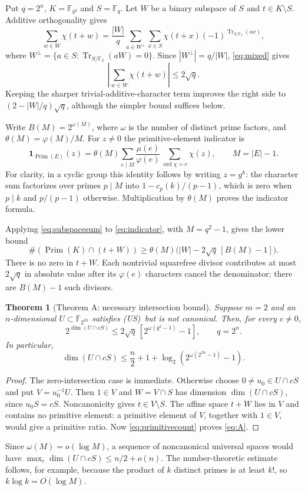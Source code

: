 \documentclass[11pt,a4paper]{article}
\newtheorem{theorem}{Theorem}[section]
\theoremstyle{definition}\newtheorem{definition}[theorem]{Definition}
\theoremstyle{remark}\newtheorem{remark}[theorem]{Remark}
\newcommand{\F}{\mathbb F}
\newcommand{\Tr}{\operatorname{Tr}}
\newcommand{\Prim}{\operatorname{Prim}}
\newcommand{\ord}{\operatorname{ord}}
\newcommand{\US}{\textup{(US)}}
\numberwithin{equation}{section}
\begin{document}
Put $q=2^n$, $K=\F_{q^2}$ and $S=\F_q$. Let $W$ be a binary subspace of $S$ and $t\in K\setminus S$. Additive orthogonality gives
\[
\sum_{w\in W}\chi(t+w)=\frac{|W|}{q}
\sum_{a\in W^\perp}\sum_{x\in S}\chi(t+x)(-1)^{\Tr_{S/\F_2}(ax)},
\]
where $W^\perp=\{a\in S:\Tr_{S/\F_2}(aW)=0\}$. Since $|W^\perp|=q/|W|$, \eqref{eq:mixed} gives
\begin{equation}\label{eq:subspacesum}
\left|\sum_{w\in W}\chi(t+w)\right|\le2\sqrt q.
\end{equation}
Keeping the sharper trivial-additive-character term improves the right side to $(2-|W|/q)\sqrt q$, although the simpler bound suffices below.

Write $B(M)=2^{\omega(M)}$, where $\omega$ is the number of distinct prime factors, and $\theta(M)=\varphi(M)/M$. For $z\ne0$ the primitive-element indicator is
\begin{equation}\label{eq:indicator}
\mathbf1_{\Prim(E)}(z)=\theta(M)\sum_{e\mid M}\frac{\mu(e)}{\varphi(e)}
\sum_{\ord\chi=e}\chi(z),\qquad M=|E|-1.
\end{equation}
For clarity, in a cyclic group this identity follows by writing $z=g^k$: the character sum factorizes over primes $p\mid M$ into $1-c_p(k)/(p-1)$, which is zero when $p\mid k$ and $p/(p-1)$ otherwise. Multiplication by $\theta(M)$ proves the indicator formula.

Applying \eqref{eq:subspacesum} to \eqref{eq:indicator}, with $M=q^2-1$, gives the lower bound
\begin{equation}\label{eq:primitivecount}
\#(\Prim(K)\cap(t+W))\ge\theta(M)
\bigl(|W|-2\sqrt q\,[B(M)-1]\bigr).
\end{equation}
There is no zero in $t+W$. Each nontrivial squarefree divisor contributes at most $2\sqrt q$ in absolute value after its $\varphi(e)$ characters cancel the denominator; there are $B(M)-1$ such divisors.

\begin{theorem}[Theorem A: necessary intersection bound]\label{thm:A}
Suppose $m=2$ and an $n$-dimensional $U\subset\F_{2^{2n}}$ satisfies \US\ but is not canonical. Then, for every $c\ne0$,
\begin{equation}\label{eq:A}
2^{\dim(U\cap cS)}\le2\sqrt q\,[2^{\omega(q^2-1)}-1],\qquad q=2^n.
\end{equation}
In particular,
\[
\dim(U\cap cS)\le\frac n2+1+\log_2(2^{\omega(2^{2n}-1)}-1).
\]
\end{theorem}
\begin{proof}
The zero-intersection case is immediate. Otherwise choose $0\ne u_0\in U\cap cS$ and put $V=u_0^{-1}U$. Then $1\in V$ and $W=V\cap S$ has dimension $\dim(U\cap cS)$, since $u_0S=cS$. Noncanonicity gives $t\in V\setminus S$. The affine space $t+W$ lies in $V$ and contains no primitive element: a primitive element of $V$, together with $1\in V$, would give a primitive ratio. Now \eqref{eq:primitivecount} proves \eqref{eq:A}.
\end{proof}
Since $\omega(M)=o(\log M)$, a sequence of noncanonical universal spaces would have $\max_c\dim(U\cap cS)\le n/2+o(n)$. The number-theoretic estimate follows, for example, because the product of $k$ distinct primes is at least $k!$, so $k\log k=O(\log M)$.
\end{document}
